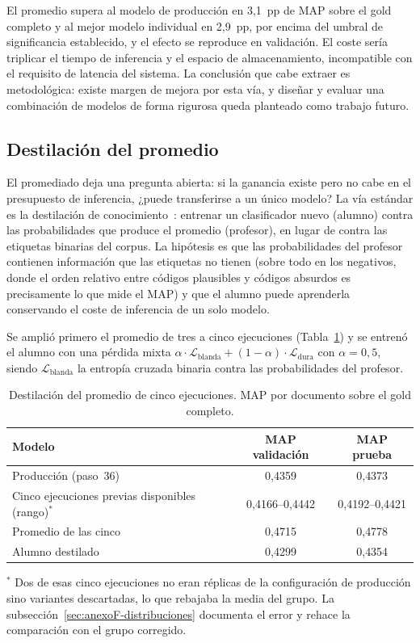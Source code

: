 El promedio supera al modelo de producción en 3{,}1~pp de MAP sobre el gold completo y al mejor modelo individual en 2{,}9~pp, por encima del umbral de significancia establecido, y el efecto se reproduce en validación. El coste sería triplicar el tiempo de inferencia y el espacio de almacenamiento, incompatible con el requisito de latencia del sistema. La conclusión que cabe extraer es metodológica: existe margen de mejora por esta vía, y diseñar y evaluar una combinación de modelos de forma rigurosa queda planteado como trabajo futuro.

\subsection{Destilación del promedio}

El promediado deja una pregunta abierta: si la ganancia existe pero no cabe en el presupuesto de inferencia, ¿puede transferirse a un único modelo? La vía estándar es la destilación de conocimiento~\cite{hinton2015distilling}: entrenar un clasificador nuevo (alumno) contra las probabilidades que produce el promedio (profesor), en lugar de contra las etiquetas binarias del corpus. La hipótesis es que las probabilidades del profesor contienen información que las etiquetas no tienen (sobre todo en los negativos, donde el orden relativo entre códigos plausibles y códigos absurdos es precisamente lo que mide el MAP) y que el alumno puede aprenderla conservando el coste de inferencia de un solo modelo.

Se amplió primero el promedio de tres a cinco ejecuciones (Tabla~\ref{tab:map-distill}) y se entrenó el alumno con una pérdida mixta $\alpha \cdot \mathcal{L}_{\text{blanda}} + (1-\alpha) \cdot \mathcal{L}_{\text{dura}}$ con $\alpha = 0{,}5$, siendo $\mathcal{L}_{\text{blanda}}$ la entropía cruzada binaria contra las probabilidades del profesor.

\begin{table}[h]
\centering
\caption{Destilación del promedio de cinco ejecuciones. MAP por documento sobre el gold completo.}
\label{tab:map-distill}
\begin{tabular}{lcc}
\hline
\textbf{Modelo} & \textbf{MAP validación} & \textbf{MAP prueba} \\
\hline
Producción (paso~36) & 0{,}4359 & 0{,}4373 \\
Cinco ejecuciones previas disponibles (rango)$^{*}$ & 0{,}4166--0{,}4442 & 0{,}4192--0{,}4421 \\
Promedio de las cinco & 0{,}4715 & 0{,}4778 \\
Alumno destilado & 0{,}4299 & 0{,}4354 \\
\hline
\end{tabular}

\vspace{2mm}
{\footnotesize $^{*}$ Dos de esas cinco ejecuciones no eran réplicas de la configuración de producción sino variantes descartadas, lo que rebajaba la media del grupo. La subsección~\ref{sec:anexoF-distribuciones} documenta el error y rehace la comparación con el grupo corregido.}
\end{table}

